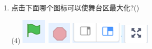 \documentclass[10.5pt, a4paper]{article}
\begin{document}
\begin{enumerate}
        \item 点击下面哪个图标可以使舞台区最大化?(\qquad)
        \begin{tasks}(4)
            \task \includegraphics[width=.04\textwidth]{10a.png}
            \task \includegraphics[width=.05\textwidth]{10b.png}
            \task \includegraphics[width=.09\textwidth]{10c.png}
            \task \includegraphics[width=.05\textwidth]{10d.png}
        \end{tasks}



\end{enumerate}
\end{document}
